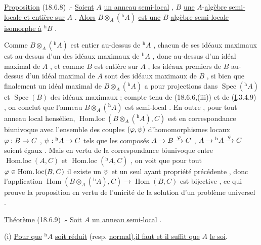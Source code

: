 \uline{Proposition} (18.6.8) .- \uline{Soient} $A$ \uline{un anneau semi-local} , $B$ \uline{une} $A$-\uline{algèbre semi-locale et entière sur} $A$ . \uline{Alors} $B\otimes_A({}^{\mathrm h}A)$ \uline{est une} $B$-\uline{algèbre semi-locale isomorphe à} $ {}^{\mathrm h}B$ .

 Comme $B\otimes_A({}^{\mathrm h}A)$ est
entier au-dessus de $ {}^{\mathrm h}A$ , chacun de ses idéaux maximaux est au-dessus d'un
des idéaux maximaux de $ {}^{\mathrm h}A$ , donc au-dessus d'un idéal maximal de $A$ , et comme
$B$ est entière sur $A$ , les idéaux premiers de $B$ au-dessus d'un idéal maximal
de $A$ sont des idéaux maximaux de $B$ , si bien que finalement un idéal maximal
de $B\otimes_A({}^{\mathrm h}A)$ a pour projections dans $\operatorname{Spec}({}^{\mathrm h}A)$ et $\operatorname{Spec}(B)$ des idéaux maximaux
; compte tenu de (18.6.6,(iii)) et de (\uline{I},3.4.9) , on conclut que l'anneau
$B\otimes_A({}^{\mathrm h}A)$ est semi-local . En outre , pour tout anneau local hensélien,
$\operatorname{Hom.loc}(B\otimes_A({}^{\mathrm h}A),C)$ est en correspondance biunivoque avec l'ensemble des
couples $(\varphi,\psi)$ d'homomorphismes locaux $\varphi:B\to C$ , $\psi:{}^{\mathrm h}A\to C$ tels que les composés
$A\to B\xrightarrow{\varphi}C$ , $A\to{}^{\mathrm h}A\xrightarrow{\psi}C$ soient égaux . Mais  en vertu
de la correspondance biunivoque entre $\operatorname{Hom.loc}(A,C)$ et $\operatorname{Hom.loc}({}^{\mathrm h}A,C)$ , on
voit que pour tout $\varphi\in\operatorname{Hom.loc}(B,C)$ il existe un $\psi$ et un seul ayant   propriété
précédente , donc l'application $\operatorname{Hom}(B\otimes_A({}^{\mathrm h}A),C)\to\operatorname{Hom}(B,C)$ est bijective
, ce qui prouve la proposition en vertu de l'unicité de la solution
d'un problème universel .

\uline{Théorème} (18.6.9) .- \uline{Soit} $A$ \uline{un anneau semi-local} .

(i) \uline{Pour que} $ {}^{\mathrm h}A$ \uline{soit réduit} (resp. \uline{normal),il faut et il suffit que} $A$ \uline{le soi}.


